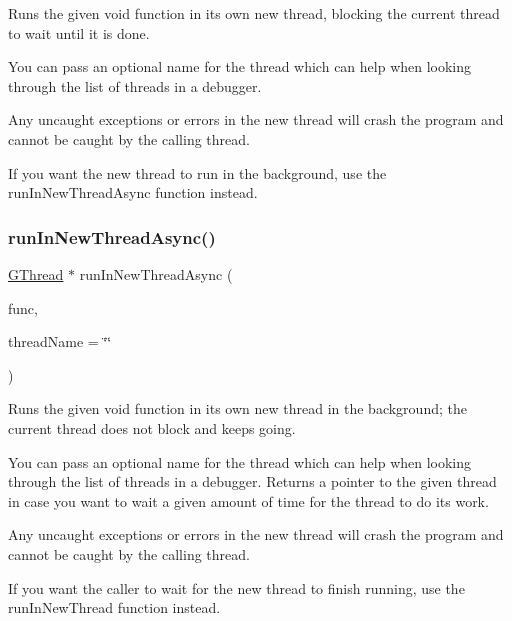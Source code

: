 Runs the given void function in its own new thread, blocking the current thread to wait until it is done. 

You can pass an optional name for the thread which can help when looking through the list of threads in a debugger.

Any uncaught exceptions or errors in the new thread will crash the program and cannot be caught by the calling thread.

If you want the new thread to run in the background, use the {\ttfamily run\+In\+New\+Thread\+Async} function instead. \mbox{\label{classGThread_aee1af0236d033fce36073899bb4368ed}} 
\subsubsection{\texorpdfstring{run\+In\+New\+Thread\+Async()}{runInNewThreadAsync()}}
{\footnotesize\ttfamily \mbox{\hyperlink{classGThread}{G\+Thread}} $\ast$ run\+In\+New\+Thread\+Async (\begin{DoxyParamCaption}\item[{G\+Thunk}]{func,  }\item[{const std\+::string \&}]{thread\+Name = {\ttfamily \char`\"{}\char`\"{}} }\end{DoxyParamCaption})\hspace{0.3cm}{\ttfamily [static]}}



Runs the given void function in its own new thread in the background; the current thread does not block and keeps going. 

You can pass an optional name for the thread which can help when looking through the list of threads in a debugger. Returns a pointer to the given thread in case you want to wait a given amount of time for the thread to do its work.

Any uncaught exceptions or errors in the new thread will crash the program and cannot be caught by the calling thread.

If you want the caller to wait for the new thread to finish running, use the {\ttfamily run\+In\+New\+Thread} function instead. \mbox{\label{classGThread_a33da0c87717269710ac7a564a1ebbe64}} 

